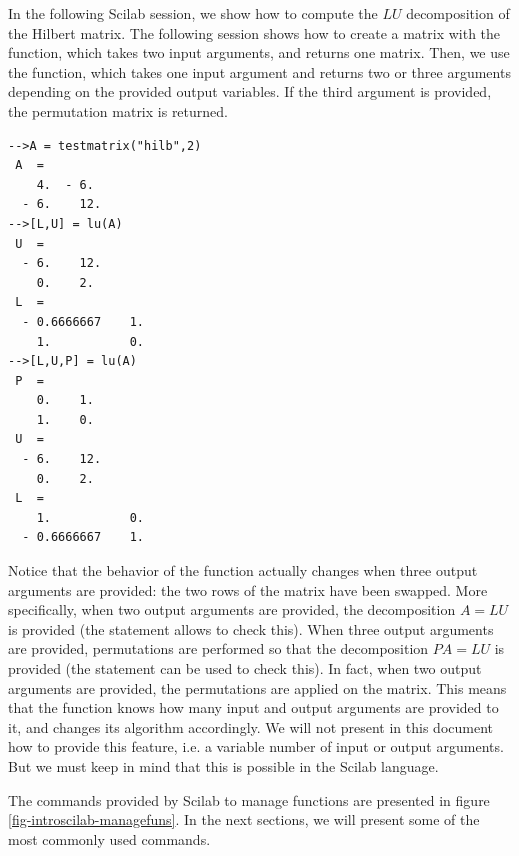 In the following Scilab session, we show how to compute the $LU$ decomposition
of the Hilbert matrix. The following session shows how to create
a matrix with the  function, which takes two input arguments,
and returns one matrix. Then, we use the  function, which takes one 
input argument and returns two or three arguments depending on the provided 
output variables. If the third argument  is provided, the permutation matrix
is returned.
\lstset{language=scilabscript}
\begin{lstlisting}
-->A = testmatrix("hilb",2)
 A  =
    4.  - 6.   
  - 6.    12.  
-->[L,U] = lu(A)
 U  =
  - 6.    12.  
    0.    2.   
 L  =
  - 0.6666667    1.  
    1.           0.  
-->[L,U,P] = lu(A)
 P  =
    0.    1.  
    1.    0.  
 U  =
  - 6.    12.  
    0.    2.   
 L  =
    1.           0.  
  - 0.6666667    1.  
\end{lstlisting}

Notice that the behavior of the  function actually changes
when three output arguments are provided: the two rows of the matrix  have 
been swapped. More specifically, when two output arguments 
are provided, the decomposition $A=LU$ is provided (the statement 
allows to check this). When three output arguments 
are provided, permutations are performed so that the decomposition
$PA=LU$ is provided (the statement 
can be used to check this). In fact, when two output arguments are provided, 
the permutations are applied on the  matrix. This means that the  function 
knows how many input and output arguments are provided to it,
and changes its algorithm accordingly. We will not present in this document how to provide this feature, i.e. a 
variable number of input or output arguments. But we must keep in mind that 
this is possible in the Scilab language.

The commands provided by Scilab to manage functions are presented in 
figure \ref{fig-introscilab-managefuns}. 
In the next sections, we will present some of the most commonly used commands.

